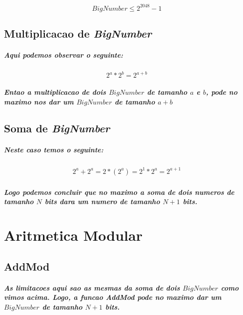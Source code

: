 \documentclass[12pt,twoside, a4paper, twocolumn]{article}
\begin{document}
\begin{equation}
    BigNumber \le 2^{2048} - 1
\end{equation}

\subsection{Multiplicacao de \emph{BigNumber}}

\subparagraph*{Aqui podemos observar o seguinte:}

\begin{equation}
    2^a * 2^b = 2^{a + b}
\end{equation}

\subparagraph*{Entao a multiplicacao de dois $BigNumber$ de tamanho $a$ e $b$, pode no maximo nos dar um $BigNumber$ de tamanho $a+b$}

\subsection{Soma de \emph{BigNumber}}

\subparagraph*{Neste caso temos o seguinte:}

\begin{equation}
    \begin{aligned}
        2^a + 2^a = 2*(2^a) = 2^1 * 2^a = 2^{a + 1}
    \end{aligned}
\end{equation}

\subparagraph*{Logo podemos concluir que no maximo a soma de dois numeros de tamanho $N$ bits dara um numero de tamanho $N+1$ bits.}

\section{Aritmetica Modular}

\subsection{AddMod}

\subparagraph*{As limitacoes aqui sao as mesmas da soma de dois $BigNumber$ como vimos acima. Logo, a funcao AddMod pode no maximo dar um $BigNumber$ de tamanho $N+1$ bits.}
\end{document}
